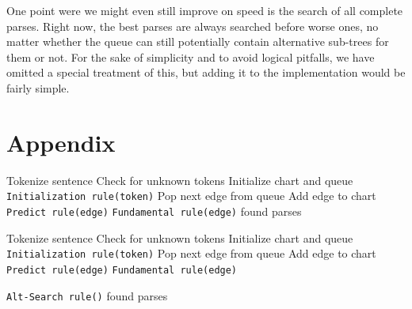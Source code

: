 \documentclass[11pt, titlepage, a4paper]{scrartcl}		%
\newcommand{\XMas}[1]{Alt-Search#1}
\begin{document}
One point were we might even still improve on speed is the search of all complete parses. Right now, the best parses are always searched before worse ones, no matter whether the queue can still potentially contain alternative sub-trees for them or not.
For the sake of simplicity and to avoid logical pitfalls, we have omitted a special treatment of this, but adding it to the implementation would be fairly simple.

\appendix
\clearpage
\section{Appendix}

\begin{algorithm}
\caption{Basic Bottom-Up Parsing Algorithm}
\label{alg:basic}
\begin{algorithmic}[1]
\STATE Tokenize sentence
\STATE Check for unknown tokens
\STATE Initialize chart and queue
    \STATE \texttt{Initialization rule(token)}
\ENDFOR
{} \label{alg:basic:parse:start}
    \STATE Pop next edge from queue
    \STATE Add edge to chart
        \STATE \texttt{Predict rule(edge)}
    \ENDIF
    \STATE \texttt{Fundamental rule(edge)}
\ENDWHILE  \label{alg:basic:parse:end}
\RETURN found parses
\end{algorithmic}
\end{algorithm}

\begin{algorithm}
\caption{Bottom-Up Parsing Algorithm with \XMas{} Extension}
\label{alg:alt}
\begin{algorithmic}[1]
\STATE Tokenize sentence
\STATE Check for unknown tokens
\STATE Initialize chart and queue
    \STATE \texttt{Initialization rule(token)}
\ENDFOR
{} \label{alg:alt:parse:start}
    \STATE Pop next edge from queue
    \STATE Add edge to chart
        \STATE \texttt{Predict rule(edge)}
    \ENDIF
    \STATE \texttt{Fundamental rule(edge)}
    
        \STATE \texttt{\XMas{} rule()}    
    \ENDIF
\ENDWHILE  \label{alg:alt:parse:end}
\RETURN found parses
\end{algorithmic}
\end{algorithm}
\end{document}
